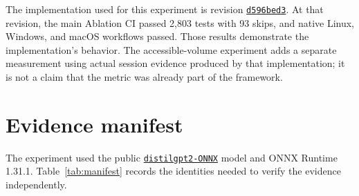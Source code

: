 \documentclass[11pt,a4paper]{article}
\begin{document}
The implementation used for this experiment is revision \href{https://github.com/Ablation-Tool/ablation/commit/d596bed31ba5fe361efa1c6fdad6d86e3126ab63}{\texttt{d596bed3}}. At that revision, the main Ablation CI passed 2,803 tests with 93 skips, and native Linux, Windows, and macOS workflows passed. Those results demonstrate the implementation's behavior. The accessible-volume experiment adds a separate measurement using actual session evidence produced by that implementation; it is not a claim that the metric was already part of the framework.

\section{Evidence manifest}
The experiment used the public \href{https://huggingface.co/onnx-community/distilgpt2-ONNX}{\texttt{distilgpt2-ONNX}} model and ONNX Runtime 1.31.1. Table~\ref{tab:manifest} records the identities needed to verify the evidence independently.
\end{document}
